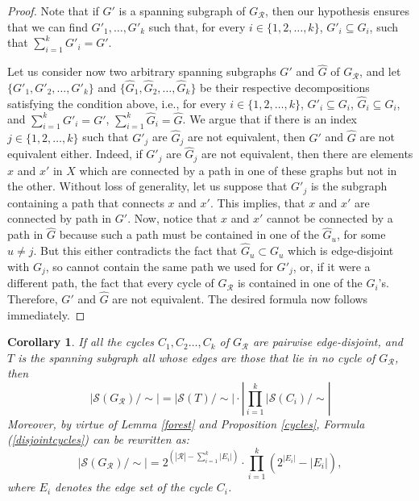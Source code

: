 \documentclass[12pt]{extarticle}
\newtheorem{Corollary}{Corollary}
\begin{document}
	\begin{proof}
		Note that if $G'$ is a spanning subgraph of $G_{\mathcal{R}}$, then our hypothesis ensures that we can find $G'_1, \ldots, G'_k$ such that, for every $i \in\{ 1, 2,\ldots, k\}$,   $G'_i \subseteq G_i$, such that $\sum_{i=1}^{k} G'_i = G' $.
		
		Let us consider now two arbitrary spanning subgraphs $G'$ and $\hat{G}$ of $G_{\mathcal{R}}$, and let  \( \{G'_1, G'_2, \ldots, G'_k\} \) and \( \{\hat{G}_1, \hat{G}_2, \ldots, \hat{G}_k\} \) be their respective decompositions satisfying the condition above, i.e., for every \( i\in\{ 1, 2, \ldots, k\}\), \( G'_i \subseteq G_i \), \( \hat{G}_i \subseteq G_i \), and $\sum_{i=1}^{k} G'_i = G' $, $\sum_{i=1}^{k} \hat{G}_i = \hat{G}$. We argue that if there is an index \( j \in\{ 1, 2, \ldots, k\}\) such that \( G'_j \) are \( \hat{G}_j \) are not equivalent, then $G'$ and $\hat{G}$ are not equivalent either. Indeed, if \( G'_j \) are \( \hat{G}_j \) are not equivalent, then there are elements $x$ and $x'$ in $X$ which are connected by a path in one of these graphs but not in the other. Without loss of generality, let us suppose that $G'_j$ is the subgraph containing a path that connects $x$ and $x'$. This implies, that $x$ and $x'$ are connected by path in $G'$. Now, notice that $x$ and $x'$ cannot be connected by a path in $\hat{G}$ because such a path must be contained in one of the $\hat{G}_u$, for some $u\neq j$. But this either contradicts the fact that $\hat{G}_u\subset G_u$ which is edge-disjoint with $G_j$, so cannot contain the same path we used for $G'_j$, or, if it were a different path, the fact that every cycle of $G_{\mathcal{R}}$ is contained in one of the $G_i$'s.
		Therefore, $G'$ and $\hat{G}$ are not equivalent. The desired formula now follows immediately.
	\end{proof}
	
	\begin{Corollary} \label{corollaryedgedisjointcycles}
		If all the cycles $C_1, C_2 \ldots, C_k$ of \(G_{\mathcal{R}} \) are pairwise edge-disjoint, and $T$ is the spanning subgraph all whose edges are those that lie in no cycle of \(G_{\mathcal{R}} \), then \begin{equation}\label{disjointcycles}
		|\mathcal{S}(G_{\mathcal{R}})/\sim| = |\mathcal{S}(T)/\sim|\cdot\left|\prod_{i=1}^{k} |\mathcal{S}(C_i)/\sim\right|\end{equation} Moreover, by virtue of Lemma \ref{forest} and Proposition \ref{cycles}, Formula (\ref{disjointcycles}) can be rewritten as:
		\begin{equation}	|\mathcal{S}(G_{\mathcal{R}})/\sim|= 2^{\left(|\mathcal{R}| -\sum_{i=1}^{k} |E_i|\right)}  \cdot \prod_{i=1}^{k} (2^{|E_i|}-|E_i|), \end{equation} where $E_i$ denotes the edge set of the cycle $C_i$.
	\end{Corollary}
	
\end{document}
